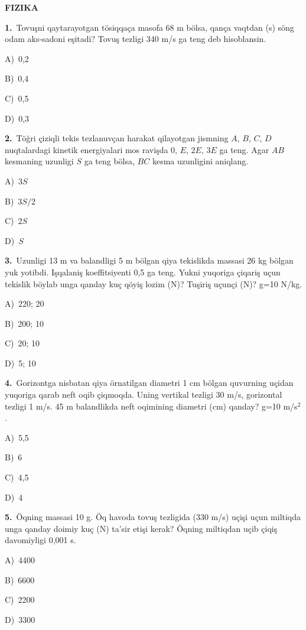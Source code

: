 \documentclass[11pt,a4paper]{article}
\newcommand{\opt}[2]{\hspace*{4mm}#1)\ #2\par}
\begin{document}
\begin{center}{\Large\textbf{FIZIKA}}\end{center}
\noindent\begin{minipage}{\linewidth}
\textbf{1.}\ Tovuşni qaytarayotgan tösiqqaça masofa 68 m bölsa, qança vaqtdan (s) söng odam aks-sadoni eşitadi? Tovuş tezligi 340 m/s ga teng deb hisoblansin.\par\smallskip
\opt{A}{0,2}
\opt{B}{0,4}
\opt{C}{0,5}
\opt{D}{0,3}
\end{minipage}\vspace{9pt}\par
\noindent\begin{minipage}{\linewidth}
\textbf{2.}\ Töğri çiziqli tekis tezlanuvçan harakat qilayotgan jismning $A$, $B$, $C$, $D$ nuqtalardagi kinetik energiyalari mos ravişda 0, $E$, $2E$, $3E$ ga teng. Agar $AB$ kesmaning uzunligi $S$ ga teng bölsa, $BC$ kesma uzunligini aniqlang.\par\smallskip
\opt{A}{$3S$}
\opt{B}{$3S/2$}
\opt{C}{$2S$}
\opt{D}{$S$}
\end{minipage}\vspace{9pt}\par
\noindent\begin{minipage}{\linewidth}
\textbf{3.}\ Uzunligi 13 m va balandligi 5 m bölgan qiya tekislikda massasi 26 kg bölgan yuk yotibdi. Işqalaniş koeffitsiyenti 0,5 ga teng. Yukni yuqoriga çiqariş uçun tekislik böylab unga qanday kuç qöyiş lozim (N)? Tuşiriş uçunçi (N)? g=10 N/kg.\par\smallskip
\opt{A}{220; 20}
\opt{B}{200; 10}
\opt{C}{20; 10}
\opt{D}{5; 10}
\end{minipage}\vspace{9pt}\par
\noindent\begin{minipage}{\linewidth}
\textbf{4.}\ Gorizontga nisbatan qiya örnatilgan diametri 1 cm bölgan quvurning uçidan yuqoriga qarab neft oqib çiqmoqda. Uning vertikal tezligi 30 m/s, gorizontal tezligi 1 m/s. 45 m balandlikda neft oqimining diametri (cm) qanday? g=10 m/s$^{2}$.\par\smallskip
\opt{A}{5,5}
\opt{B}{6}
\opt{C}{4,5}
\opt{D}{4}
\end{minipage}\vspace{9pt}\par
\noindent\begin{minipage}{\linewidth}
\textbf{5.}\ Öqning massasi 10 g. Öq havoda tovuş tezligida (330 m/s) uçişi uçun miltiqda unga qanday doimiy kuç (N) ta’sir etişi kerak? Öqning miltiqdan uçib çiqiş davomiyligi 0,001 s.\par\smallskip
\opt{A}{4400}
\opt{B}{6600}
\opt{C}{2200}
\opt{D}{3300}
\end{minipage}\vspace{9pt}\par
\end{document}
